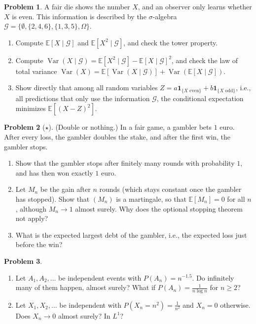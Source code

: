 \documentclass[11pt]{article}
\theoremstyle{definition}
\newtheorem{problem}{Problem}[section]
\newcommand{\E}{\mathbb{E}}
\DeclareMathOperator{\Var}{Var}
\begin{document}
\begin{problem}\label{pr:conditional-sigma}
    A fair die shows the number $X$, and an observer only learns whether $X$ is even. This information is described by the $\sigma$-algebra $\mathcal{G} = \{\emptyset, \{2, 4, 6\}, \{1, 3, 5\}, \Omega\}$.
    \begin{enumerate}[label=(\alph*)]
        \item Compute $\E[X \mid \mathcal{G}]$ and $\E[X^2 \mid \mathcal{G}]$, and check the tower property.
        \item Compute $\Var(X \mid \mathcal{G}) = \E[X^2 \mid \mathcal{G}] - \E[X \mid \mathcal{G}]^2$, and check the law of total variance $\Var(X) = \E[\Var(X \mid \mathcal{G})] + \Var(\E[X \mid \mathcal{G}])$.
        \item Show directly that among all random variables $Z = a\mathbf{1}_{\{X \text{ even}\}} + b\mathbf{1}_{\{X \text{ odd}\}}$, i.e., all predictions that only use the information $\mathcal{G}$, the conditional expectation minimizes $\E[(X - Z)^2]$.
    \end{enumerate}
\end{problem}

\begin{problem}[$\star$]\label{pr:double-or-nothing}
    (Double or nothing.) In a fair game, a gambler bets $1$ euro. After every loss, the gambler doubles the stake, and after the first win, the gambler stops.
    \begin{enumerate}[label=(\alph*)]
        \item Show that the gambler stops after finitely many rounds with probability $1$, and has then won exactly $1$ euro.
        \item Let $M_n$ be the gain after $n$ rounds (which stays constant once the gambler has stopped). Show that $(M_n)$ is a martingale, so that $\E[M_n] = 0$ for all $n$, although $M_n \to 1$ almost surely. Why does the optional stopping theorem not apply?
        \item What is the expected largest debt of the gambler, i.e., the expected loss just before the win?
    \end{enumerate}
\end{problem}

\begin{problem}\label{pr:borel-cantelli}
    \begin{enumerate}[label=(\alph*)]
        \item Let $A_1, A_2, \ldots$ be independent events with $P(A_n) = n^{-1.5}$. Do infinitely many of them happen, almost surely? What if $P(A_n) = \frac{1}{n\log n}$ for $n \geq 2$?
        \item Let $X_1, X_2, \ldots$ be independent with $P(X_n = n^2) = \frac{1}{n^2}$ and $X_n = 0$ otherwise. Does $X_n \to 0$ almost surely? In $L^1$?
    \end{enumerate}
\end{problem}
\end{document}
